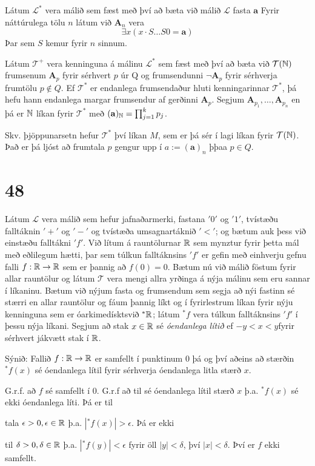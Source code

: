 \documentclass[12pt]{book}
\newcommand{\cT}{\mathcal{T}}
\newcommand{\cL}{\mathcal{L}}
\newcommand{\bA}{\mathbf{A}}
\newcommand{\ba}{\mathbf{a}}
\begin{document}
\begin{lausn}[Tandri]
  Látum $\cL^*$ vera málið sem fæst með því að bæta við málið
  $\cL$ fasta $\ba$ Fyrir náttúrulega tölu $n$ látum við
  $\bA_n$ vera 
  \[ \exists x ( x \cdot S \dotsc S 0= \ba) \]
  Þar sem $S$ kemur fyrir $n$ sinnum.

  Látum $\cT^+$ vera kenninguna á málinu $\cL^*$ sem fæst með því að bæta við
  $\cT(\N)$ frumsenum $\bA_p$ fyrir sérhvert $p$ úr Q og frumsendunni
  $\lnot \bA_p$ fyrir sérhverja frumtölu $p \not \in Q$. 
  Ef $\cT^*$ er endanlega frumsendaður hluti kenningarinnar $\cT^*$,
  þá hefu hann endanlega margar frumsendur af gerðinni $\bA_p$.
  Segjum
  $\bA_{p_1}, \dotsc, \bA_{p_n}$ en þá er $\mathbb{N}$ líkan fyrir
  $\cT^*$ með $(\ba)_{\N} = \prod_{j=1}^k p_j$.

  Skv. þjöppunarsetn hefur $\cT^*$ því líkan $M$, sem er þá sér í lagi líkan
  fyrir $\cT(\N)$. Það er þá ljóst að frumtala $p$ gengur upp í $ a := (\ba)_n$
  þþaa $p \in Q$.
\end{lausn}




\section{48}

\begin{daemi}
  Látum $\cL$ vera málið sem hefur jafnaðarmerki, fastana $'0'$ og $'1'$,
  tvístæðu falltáknin $'+'$ og $'-'$ og tvístæða umsagnartáknið $'<'$;
  og bætum auk þess við einstæðu falltákni $'f'$. Við lítum á rauntölurnar $\mathbb{R}$ 
 sem mynztur fyrir þetta mál með eðlilegum hætti, þar sem túlkun falltáknsins 
 $'f'$ er gefin með einhverju gefnu falli $f:\mathbb{R} \to  \mathbb{R}$
 sem er þannig að $f(0) = 0$. Bætum nú við málið föstum fyrir allar rauntölur og látum
 $\cT$ vera mengi allra yrðinga á nýja málinu sem eru sannar 
 í líkaninu. Bætum við nýjum fasta og frumsendum sem segja að nýi fastinn sé 
 stærri en allar rauntölur og fáum þannig líkt og í fyrirlestrum líkan fyrir nýju
 kenninguna sem er óarkimedísktsvið ${}^*\mathbb{R}$; látum ${}^*f$
 vera túlkun falltáknsins $'f'$ í þessu nýja líkani. Segjum að stak $x \in \mathbb{R}$
 sé \emph{óendanlega lítið} ef $-y < x < y$fyrir sérhvert jákvætt stak í $\mathbb{R}$.

 Sýnið: Fallið $f:\mathbb{R} \to \mathbb{R}$ er samfellt í punktinum $0$ 
 þá og því aðeins að stærðin ${}^*f(x)$ sé óendanlega lítil fyrir
 sérhverja óendanlega litla stærð $x$.
\end{daemi}

\begin{lausn}[Áslaug]
G.r.f. að $f$ sé samfellt í $0$. G.r.f að til
sé óendanlega lítil stærð $x$ þ.a. ${}^*f(x)$ sé ekki óendanlega líti. Þá er til

tala $\epsilon > 0, \epsilon \in \mathbb{R}$ þ.a. $|{}^*f(x)| > \epsilon$. Þá er ekki


til $\delta > 0, \delta \in \mathbb{R}$ þ.a. $|{}^*f(y)| < \epsilon$ fyrir öll
$|y| < \delta$, því $|x| < \delta$. Því er $f$ ekki samfellt.
  
\end{lausn}
\end{document}
